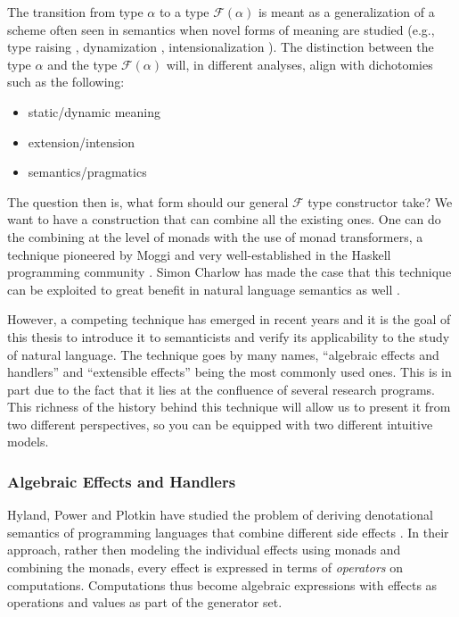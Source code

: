 The transition from type $\alpha$ to a type $\mathcal{F}(\alpha)$ is meant
as a generalization of a scheme often seen in semantics when novel forms of
meaning are studied (e.g., type raising \cite{montague1973proper},
dynamization \cite{lebedeva2012expression}, intensionalization
\cite{de2013note}). The distinction between the type $\alpha$ and the type
$\mathcal{F}(\alpha)$ will, in different analyses, align with dichotomies
such as the following:

\begin{itemize}
\item static/dynamic meaning
\item extension/intension
\item semantics/pragmatics
\end{itemize}

The question then is, what form should our general $\mathcal{F}$ type
constructor take? We want to have a construction that can combine all the
existing ones. One can do the combining at the level of monads with the use
of monad transformers, a technique pioneered by Moggi and very
well-established in the Haskell programming community
\cite{moggi1991notions}. Simon Charlow has made the case that this
technique can be exploited to great benefit in natural language semantics
as well \cite{charlow2014semantics}.

However, a competing technique has emerged in recent years and it is the
goal of this thesis to introduce it to semanticists and verify its
applicability to the study of natural language. The technique goes by many
names, ``algebraic effects and handlers'' and ``extensible effects'' being
the most commonly used ones. This is in part due to the fact that it lies
at the confluence of several research programs. This richness of the
history behind this technique will allow us to present it from two
different perspectives, so you can be equipped with two different intuitive
models.

\subsubsection*{Algebraic Effects and Handlers}

Hyland, Power and Plotkin have studied the problem of deriving denotational
semantics of programming languages that combine different side effects
\cite{hyland2006combining}. In their approach, rather then modeling the
individual effects using monads and combining the monads, every effect is
expressed in terms of \emph{operators} on computations. Computations thus
become algebraic expressions with effects as operations and values as part
of the generator set.

